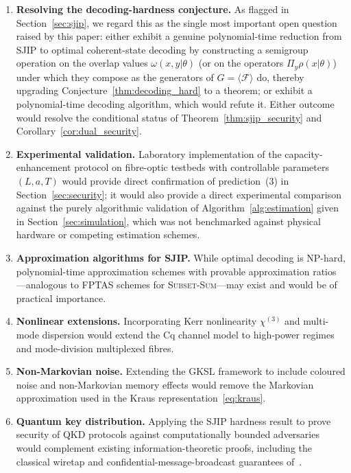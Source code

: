 \documentclass[journal,twocolumn]{IEEEtran}
\theoremstyle{definition}
\theoremstyle{plain}
\begin{document}
\begin{enumerate}[leftmargin=*, label=(\arabic*), itemsep=2pt]
  \item \textbf{Resolving the decoding-hardness conjecture.}  As
    flagged in Section~\ref{sec:sjip}, we regard this as the single
    most important open question raised by this paper: either
    exhibit a genuine polynomial-time reduction from SJIP to optimal
    coherent-state decoding by constructing a semigroup operation on
    the overlap values $\omega(x,y|\theta)$ (or on the operators
    $\Pi_y\rho(x|\theta)$) under which they compose as the generators
    of $G=\langle\mathcal F\rangle$ do, thereby upgrading
    Conjecture~\ref{thm:decoding_hard} to a theorem; or exhibit a
    polynomial-time decoding algorithm, which would refute it.
    Either outcome would resolve the conditional status of
    Theorem~\ref{thm:sjip_security} and
    Corollary~\ref{cor:dual_security}.

  \item \textbf{Experimental validation.}  Laboratory implementation
    of the capacity-enhancement protocol on fibre-optic testbeds
    with controllable parameters $(L, a, T)$ would provide direct
    confirmation of prediction~(3) in Section~\ref{sec:security}; it
    would also provide a direct experimental comparison against the
    purely algorithmic validation of Algorithm~\ref{alg:estimation}
    given in Section~\ref{sec:simulation}, which was not benchmarked
    against physical hardware or competing estimation schemes.

  \item \textbf{Approximation algorithms for SJIP.}  While optimal
    decoding is NP-hard, polynomial-time approximation schemes with
    provable approximation ratios---analogous to FPTAS schemes for
    \textsc{Subset-Sum}---may exist and would be of practical
    importance.

  \item \textbf{Nonlinear extensions.}  Incorporating Kerr
    nonlinearity $\chi^{(3)}$ and multi-mode dispersion would
    extend the Cq channel model to high-power regimes and
    mode-division multiplexed fibres.

  \item \textbf{Non-Markovian noise.}  Extending the GKSL framework
    to include coloured noise and non-Markovian memory effects would
    remove the Markovian approximation used in the Kraus
    representation~\eqref{eq:kraus}.

  \item \textbf{Quantum key distribution.}  Applying the
    SJIP hardness result to prove security of QKD protocols against
    computationally bounded adversaries would complement existing
    information-theoretic proofs, including the classical wiretap
    and confidential-message-broadcast guarantees
    of~\cite{wyner1975,csiszarkorner1978}.


\end{enumerate}
\end{document}
